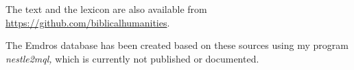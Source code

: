 \documentclass[11pt,oneside,a4paper]{memoir}
\begin{document}
The text and the lexicon are also available from \url{https://github.com/biblicalhumanities}.

The Emdros database has been created based on these sources using my program
\emph{nestle2mql,} which is currently not published or documented.

\printindex
\end{document}
